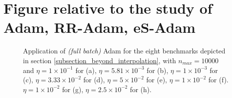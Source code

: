 \documentclass[article,authoryear,jmlmc]{beg_32}             %
\begin{document}
\section{Figure relative to the study of Adam, RR-Adam, eS-Adam}
\begin{figure}[h!]
	\centering
	\scalebox{0.60}{}
        \caption{
          Application of {\em (full batch)} Adam for the eight benchmarks depicted in section \ref{subsection_beyond_interpolation}, with $n_{max}=10000$ and
 $\eta = 1   \times 10^{-1}$  for \exOne    (a),
 $\eta = 5.81\times 10^{-3}$  for \exTwo    (b),
 $\eta = 1   \times 10^{-3}$  for \exThree  (c),
 $\eta = 3.33\times 10^{-2}$  for \exFour   (d),
 $\eta = 5   \times 10^{-2}$  for \exFive   (e),
 $\eta = 1   \times 10^{-2}$  for \exSix    (f).
 $\eta = 1   \times 10^{-2}$  for \exSeven  (g),
 $\eta = 2.5 \times 10^{-2}$  for \exHeight (h).
}
	\label{adam_fb_exs}
\end{figure}

\clearpage

\section{}
\label{pseudo_code}
\end{document}
